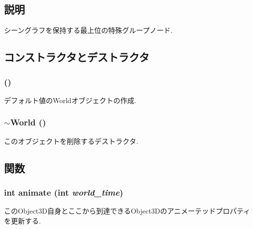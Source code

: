 \subsection{説明}
シーングラフを保持する最上位の特殊グループノード. 

\subsection{コンストラクタとデストラクタ}
\hypertarget{classm3g_1_1World_75e827b8787e735882f60c266d58e02e}{
\subsubsection[{World}]{ ()}}
\label{classm3g_1_1World_75e827b8787e735882f60c266d58e02e}


デフォルト値のWorldオブジェクトの作成. \hypertarget{classm3g_1_1World_bd170ded455f0b2273c1fe06da6ea0cb}{
\subsubsection[{$\sim$World}]{\setlength{\rightskip}{0pt plus 5cm}$\sim${\bf World} ()}}
\label{classm3g_1_1World_bd170ded455f0b2273c1fe06da6ea0cb}


このオブジェクトを削除するデストラクタ. 

\subsection{関数}
\hypertarget{classm3g_1_1World_8aad1ceab4c2a03609c8a42324ce484d}{
\subsubsection[{animate}]{\setlength{\rightskip}{0pt plus 5cm}int animate (int {\em world\_\-time})}}
\label{classm3g_1_1World_8aad1ceab4c2a03609c8a42324ce484d}


このObject3D自身とここから到達できるObject3Dのアニメーテッドプロパティを更新する. 

